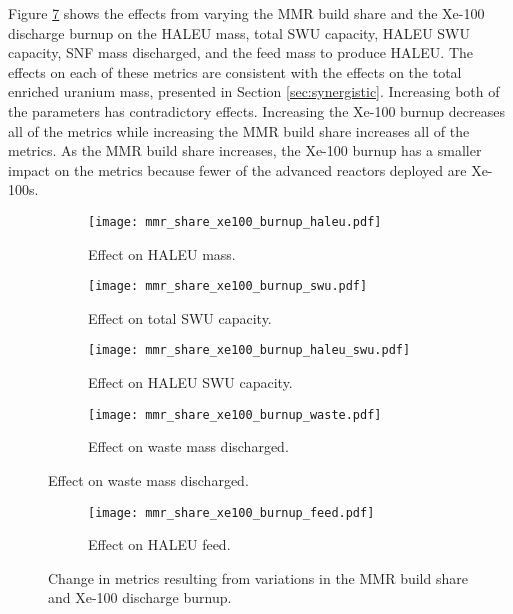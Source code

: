 Figure \ref{fig:mmr_share_xe100_burnup} shows the effects from varying 
the \gls{MMR} build share and the Xe-100 discharge burnup on the 
\gls{HALEU} mass, total \gls{SWU} capacity, \gls{HALEU} \gls{SWU} 
capacity, \gls{SNF} mass discharged, and the feed mass to produce \gls{HALEU}. 
The effects on each of these metrics are consistent with the effects on 
the total enriched uranium mass, presented in Section \ref{sec:synergistic}.
Increasing both of the parameters has contradictory effects. Increasing the 
Xe-100 burnup decreases all of the metrics while increasing the \gls{MMR} 
build share increases all of the metrics. As the \gls{MMR} build share 
increases, the Xe-100 burnup has a smaller impact on the metrics because 
fewer of the advanced reactors deployed are Xe-100s. 


\begin{figure}
    \begin{subfigure}[t]{0.48\textwidth}
        \centering
        \texttt{[image: mmr\_share\_xe100\_burnup\_haleu.pdf]}
        \caption{Effect on HALEU mass.}
        \label{fig:mmr_share_xe100_burnup_haleu}
    \end{subfigure}
    \hfill 
    \begin{subfigure}[t]{0.48\textwidth}
        \centering
        \texttt{[image: mmr\_share\_xe100\_burnup\_swu.pdf]}
        \caption{Effect on total SWU capacity.}
        \label{fig:mmr_share_xe100_burnup_swu}
    \end{subfigure}
    \hfill
    \begin{subfigure}[t]{0.48\textwidth}
        \centering
        \texttt{[image: mmr\_share\_xe100\_burnup\_haleu\_swu.pdf]}
        \caption{Effect on HALEU SWU capacity.}
        \label{fig:mmr_share_xe100_burnup_haleu_swu}
    \end{subfigure}
    \hfill
    \begin{subfigure}[t]{0.48\textwidth}
        \centering
        \texttt{[image: mmr\_share\_xe100\_burnup\_waste.pdf]}
        \caption{Effect on waste mass discharged.}
        \label{fig:mmr_share_xe100_burnup_waste}
    \end{subfigure}
\end{figure}

\begin{figure}
    \ContinuedFloat
    \begin{subfigure}[t]{0.48\textwidth}
        \centering
        \texttt{[image: mmr\_share\_xe100\_burnup\_feed.pdf]}
        \caption{Effect on HALEU feed.}
        \label{fig:mmr_share_xe100_burnup_feed}
    \end{subfigure}
    \caption{Change in metrics resulting from variations in the 
    MMR build share and Xe-100 discharge burnup.}
    \label{fig:mmr_share_xe100_burnup}
\end{figure}

